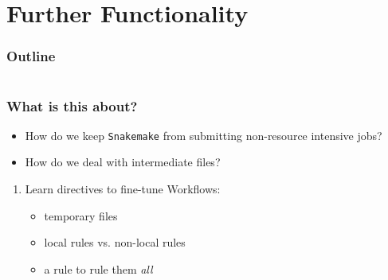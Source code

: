 \section{Further Functionality}

\begin{frame}
    \frametitle{Outline}
    \begin{columns}[t]
        \begin{column}{.5\textwidth}
            \tableofcontents[sections={1-9},currentsection]
        \end{column}
        \begin{column}{.5\textwidth}
            \tableofcontents[sections={10-18},currentsection]
        \end{column}
    \end{columns}
\end{frame}

\begin{frame}
  \frametitle{What is this about?}
   \begin{question}[Questions]
   	 \begin{itemize}
        \item How do we keep \texttt{Snakemake} from submitting non-resource intensive jobs?
        \item How do we deal with intermediate files?
     \end{itemize}
   \end{question}
   \begin{docs}[Objectives]
   	 \begin{enumerate} 
        \item Learn directives to fine-tune Workflows:
        \begin{itemize}
           \item temporary files
           \item local rules vs. non-local rules
           \item a rule to rule them \emph{all}
         \end{itemize}
     \end{enumerate}
 \end{docs}
\end{frame}

